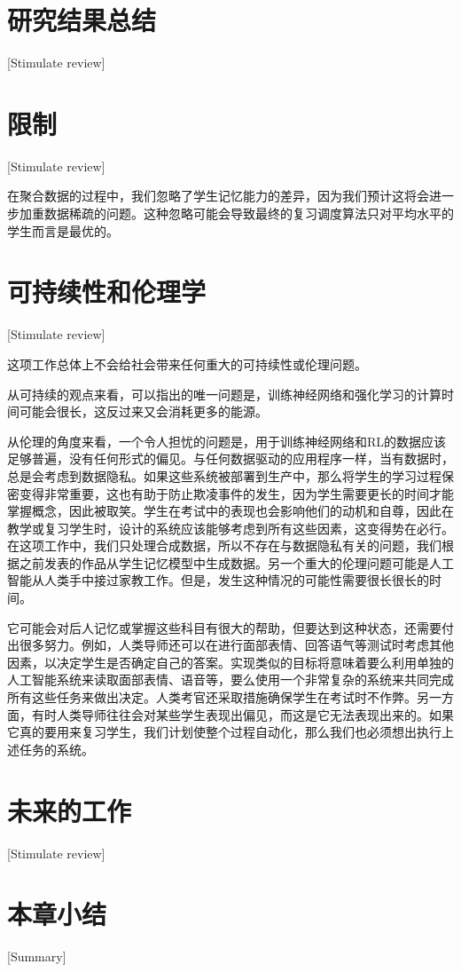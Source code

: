 \section{研究结果总结}[Stimulate review]

\section{限制}[Stimulate review]

在聚合数据的过程中，我们忽略了学生记忆能力的差异，因为我们预计这将会进一步加重数据稀疏的问题。这种忽略可能会导致最终的复习调度算法只对平均水平的学生而言是最优的。

\section{可持续性和伦理学}[Stimulate review]

这项工作总体上不会给社会带来任何重大的可持续性或伦理问题。

从可持续的观点来看，可以指出的唯一问题是，训练神经网络和强化学习的计算时间可能会很长，这反过来又会消耗更多的能源。

从伦理的角度来看，一个令人担忧的问题是，用于训练神经网络和RL的数据应该足够普遍，没有任何形式的偏见。与任何数据驱动的应用程序一样，当有数据时，总是会考虑到数据隐私。如果这些系统被部署到生产中，那么将学生的学习过程保密变得非常重要，这也有助于防止欺凌事件的发生，因为学生需要更长的时间才能掌握概念，因此被取笑。学生在考试中的表现也会影响他们的动机和自尊，因此在教学或复习学生时，设计的系统应该能够考虑到所有这些因素，这变得势在必行。在这项工作中，我们只处理合成数据，所以不存在与数据隐私有关的问题，我们根据之前发表的作品从学生记忆模型中生成数据。另一个重大的伦理问题可能是人工智能从人类手中接过家教工作。但是，发生这种情况的可能性需要很长很长的时间。

它可能会对后人记忆或掌握这些科目有很大的帮助，但要达到这种状态，还需要付出很多努力。例如，人类导师还可以在进行面部表情、回答语气等测试时考虑其他因素，以决定学生是否确定自己的答案。实现类似的目标将意味着要么利用单独的人工智能系统来读取面部表情、语音等，要么使用一个非常复杂的系统来共同完成所有这些任务来做出决定。人类考官还采取措施确保学生在考试时不作弊。另一方面，有时人类导师往往会对某些学生表现出偏见，而这是它无法表现出来的。如果它真的要用来复习学生，我们计划使整个过程自动化，那么我们也必须想出执行上述任务的系统。

\section{未来的工作}[Stimulate review]

\section{本章小结}[Summary]